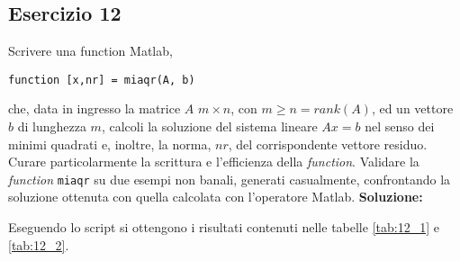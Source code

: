 \subsection{Esercizio 12}
Scrivere una function Matlab,
\begin{lstlisting}
function [x,nr] = miaqr(A, b)
\end{lstlisting}
che, data in ingresso la matrice $A$ $m \times n$, con $m \geq n = rank(A)$, ed un vettore $b$ di lunghezza
$m$, calcoli la soluzione del sistema lineare $Ax = b$ nel senso dei minimi quadrati e, inoltre, la
norma, $nr$, del corrispondente vettore residuo. Curare particolarmente la scrittura e l'efficienza della
\textit{function}. Validare la \textit{function} \lstinline{miaqr} su due esempi non banali,
generati casualmente, confrontando la soluzione ottenuta con quella calcolata con l'operatore Matlab.
\newline \textbf{Soluzione:}


Eseguendo lo script  si ottengono i risultati contenuti nelle
tabelle \ref{tab:12_1} e \ref{tab:12_2}.

